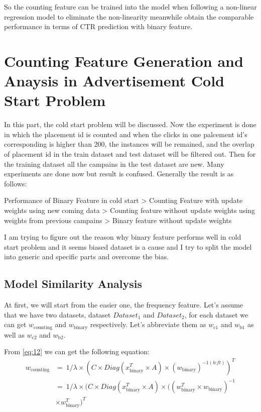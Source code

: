 So the counting feature can be trained into the model when following a non-linear regression model to eliminate the non-linearity meanwhile obtain the comparable performance in terms of CTR prediction with binary feature.

\section{Counting Feature Generation and Anaysis in Advertisement Cold Start Problem}
In this part, the cold start problem will be discussed. Now the experiment is done in which the placement id is counted and when the clicks in one palcement id's corresponding is higher than 200, the instances will be remained, and the overlap of placement id in the train dataset and test dataset will be filtered out. Then for the training dataset all the campains in the test dataset are new. Many experiments are done now but result is confused. Generally the result is as follows: 

Performance of Binary Feature in cold start > Counting Feature with update weights using new coming data > Counting feature without update weights using weights from previous campains > Binary feature without update weights


I am trying to figure out the reason why binary feature performs well in cold start problem and it seems biased dataset is a cause and I try to split the model into generic and specific parts and overcome the bias.
\subsection{Model Similarity Analysis}
At first, we will start from the easier one, the frequency feature. Let's assume that we have two datasets, dataset \(Dataset_{\text{1}}\) and \(Dataset_{\text{2}}\), for each dataset we can get \(w_{\text{counting}}\) and \(w_{\text{binary}}\) respectively. Let's abbreviate them as \(w_{\text{c1}}\) and \(w_{\text{b1}}\) as well as \(w_{\text{c2}}\) and \(w_{\text{b2}}\). 

From \ref{eq:12} we can get the following equation:
\begin{equation} \label{eq:28}
\begin{split}
w_{\text{counting}} & =\ 1/{\lambda} \times (C \times Diag(x_{\text{binary}}^T \times A) \times (w_{\text{binary}})^{-1(left)})^T \\
& = \ 1/{\lambda} \times (C \times Diag(x_{\text{binary}}^T \times A) \times ((w_{\text{binary}}^T \times w_{\text{binary}})^{-1} \\
& \times w_{\text{binary}}^T )^T
\end{split}
\end{equation}

